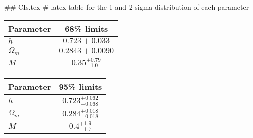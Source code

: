 ## CIs.tex
# latex table for the 1 and 2 sigma distribution of each parameter

\begin{tabular} { l  c}
 Parameter &  68\% limits\\
\hline
{\boldmath$h              $} & $0.723\pm 0.033            $\\
{\boldmath$\Omega_m       $} & $0.2843\pm 0.0090          $\\
{\boldmath$M              $} & $0.35^{+0.79}_{-1.0}       $\\
\hline
\end{tabular}

\begin{tabular} { l  c}
 Parameter &  95\% limits\\
\hline
{\boldmath$h              $} & $0.723^{+0.062}_{-0.068}   $\\
{\boldmath$\Omega_m       $} & $0.284^{+0.018}_{-0.018}   $\\
{\boldmath$M              $} & $0.4^{+1.9}_{-1.7}         $\\
\hline
\end{tabular}
